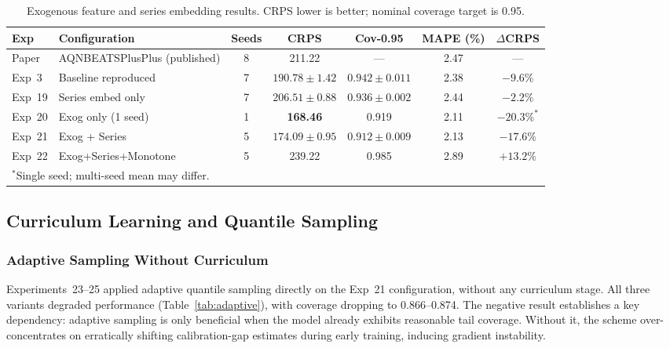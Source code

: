 \begin{table}[H]
\centering
\caption{Exogenous feature and series embedding results.
  CRPS lower is better; nominal coverage target is 0.95.}
\label{tab:exog_results}
\begin{tabular}{llccccc}
\toprule
\textbf{Exp} & \textbf{Configuration} & \textbf{Seeds} &
\textbf{CRPS} & \textbf{Cov-0.95} & \textbf{MAPE (\%)} &
\textbf{$\Delta$CRPS} \\
\midrule
Paper  & AQNBEATSPlusPlus (published)     & 8 & 211.22            & ---             & 2.47 & ---        \\
Exp~3  & Baseline reproduced       & 7 & $190.78\pm1.42$   & $0.942\pm0.011$ & 2.38 & $-9.6\%$   \\
Exp~19 & Series embed only         & 7 & $206.51\pm0.88$   & $0.936\pm0.002$ & 2.44 & $-2.2\%$   \\
Exp~20 & Exog only (1 seed)        & 1 & \textbf{168.46}   & 0.919           & 2.11 & $-20.3\%^*$\\
Exp~21 & Exog + Series             & 5 & $174.09\pm0.95$   & $0.912\pm0.009$ & 2.13 & $-17.6\%$  \\
Exp~22 & Exog+Series+Monotone      & 5 & 239.22            & 0.985           & 2.89 & $+13.2\%$  \\
\bottomrule
\multicolumn{7}{l}{\footnotesize $^*$Single seed; multi-seed mean may differ.}
\end{tabular}
\end{table}

\subsection{Curriculum Learning and Quantile Sampling}
\label{subsec:curriculum_results}

\subsubsection{Adaptive Sampling Without Curriculum}

Experiments~23--25 applied adaptive quantile sampling
directly on the Exp~21 configuration,
without any curriculum stage.  All three variants degraded performance
(Table~\ref{tab:adaptive}), with coverage dropping to 0.866--0.874.
The negative result establishes a key dependency: adaptive sampling is
only beneficial when the model already exhibits reasonable tail coverage.
Without it, the scheme over-concentrates on erratically shifting
calibration-gap estimates during early training, inducing gradient
instability.

